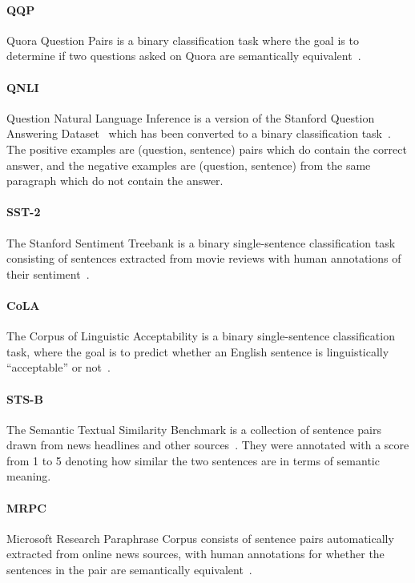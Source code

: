 \paragraph{QQP} Quora Question Pairs is a binary classification task where the goal is to determine if two questions asked on Quora are semantically equivalent~\cite{chen-etal:2018:_quora}.

\paragraph{QNLI} Question Natural Language Inference is a version of the Stanford Question Answering Dataset~\cite{rajpurkar-etal:2016:_squad} which has been converted to a binary classification task~\cite{wang-etal:2018:_glue}. The positive examples are (question, sentence) pairs which do contain the correct answer, and the negative examples are (question, sentence) from the same paragraph which do not contain the answer.

\paragraph{SST-2} The Stanford Sentiment Treebank is a binary single-sentence classification task consisting of sentences extracted from movie reviews with human annotations of their sentiment~\cite{socher-etal:2013:_recur}.

\paragraph{CoLA} The Corpus of Linguistic Acceptability is a binary single-sentence classification task, where the goal is to predict whether an English sentence is linguistically ``acceptable'' or not~\cite{warstadt-singh-bowman:2018:_corpus}.

\paragraph{STS-B} The Semantic Textual Similarity Benchmark is a collection of sentence pairs drawn from news headlines and other sources~\cite{cer-etal:2017}. They were annotated with a score from 1 to 5 denoting how similar the two sentences are in terms of semantic meaning. 

\paragraph{MRPC} Microsoft Research Paraphrase Corpus consists of sentence pairs automatically extracted from online news sources, with human annotations for whether the sentences in the pair are semantically equivalent~\cite{dolan-brockett:2005:_autom}.

